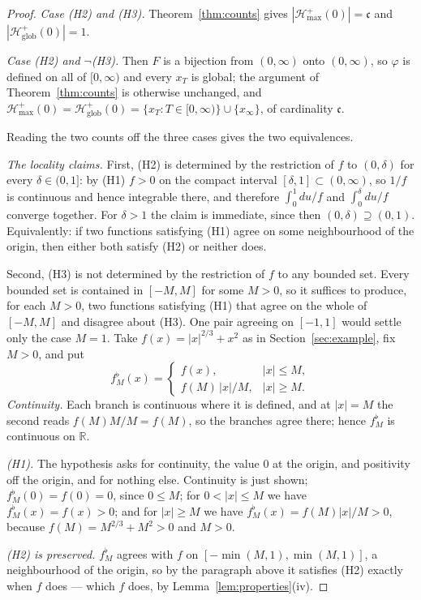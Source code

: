 \documentclass[12pt]{article}
\theoremstyle{plain}
\theoremstyle{definition}
\theoremstyle{remark}
\newcommand{\R}{\mathbb{R}}
\newcommand{\cont}{\mathfrak{c}}
\newcommand{\Hglob}{\mathcal{H}^{+}_{\mathrm{glob}}}
\newcommand{\Hmax}{\mathcal{H}^{+}_{\max}}
\begin{document}
\begin{proof}
\smallskip
\emph{Case \textup{(H2)} and \textup{(H3)}.} Theorem~\ref{thm:counts} gives
$|\Hmax(0)|=\cont$ and $|\Hglob(0)|=1$.

\smallskip
\emph{Case \textup{(H2)} and $\neg$\textup{(H3)}.} Then $F$ is a bijection from
$(0,\infty)$ onto $(0,\infty)$, so $\varphi$ is defined on all of $[0,\infty)$
and every $x_{T}$ is global; the argument of Theorem~\ref{thm:counts} is
otherwise unchanged, and $\Hmax(0)=\Hglob(0)=\{x_{T}:T\in[0,\infty)\}\cup
\{x_{\infty}\}$, of cardinality $\cont$.

\smallskip
Reading the two counts off the three cases gives the two equivalences.

\smallskip
\emph{The locality claims.} First, (H2) is determined by the restriction of $f$ to
$(0,\delta)$ for every $\delta\in(0,1]$: by (H1) $f>0$ on the compact interval
$[\delta,1]\subset(0,\infty)$, so $1/f$ is continuous and hence integrable
there, and therefore $\int_{0}^{1}du/f$ and $\int_{0}^{\delta}du/f$ converge
together. For $\delta>1$ the claim is immediate, since then
$(0,\delta)\supseteq(0,1)$. Equivalently: if two functions satisfying (H1) agree
on some neighbourhood of the origin, then either both satisfy (H2) or neither
does.

Second, (H3) is not determined by the restriction of $f$ to any bounded set. Every
bounded set is contained in $[-M,M]$ for some $M>0$, so it suffices to produce,
for each $M>0$, two functions satisfying (H1) that agree on the whole of
$[-M,M]$ and disagree about (H3). One pair agreeing on $[-1,1]$ would settle
only the case $M=1$. Take $f(x)=|x|^{2/3}+x^{2}$ as in
Section~\ref{sec:example}, fix $M>0$, and put
\[
  f^{\flat}_{M}(x)=\begin{cases}
    f(x), & |x|\le M,\\[2pt]
    f(M)\,|x|/M, & |x|\ge M .
  \end{cases}
\]
\emph{Continuity.} Each branch is continuous where it is defined, and at
$|x|=M$ the second reads $f(M)M/M=f(M)$, so the branches agree there; hence
$f^{\flat}_{M}$ is continuous on $\R$.

\emph{\textup{(H1)}.} The hypothesis asks for continuity, the value $0$ at the
origin, and positivity off the origin, and for nothing else. Continuity is just
shown; $f^{\flat}_{M}(0)=f(0)=0$, since $0\le M$; for $0<|x|\le M$ we have
$f^{\flat}_{M}(x)=f(x)>0$; and for $|x|\ge M$ we have
$f^{\flat}_{M}(x)=f(M)|x|/M>0$, because $f(M)=M^{2/3}+M^{2}>0$ and $M>0$.

\emph{\textup{(H2)} is preserved.} $f^{\flat}_{M}$ agrees with $f$ on
$[-\min(M,1),\min(M,1)]$, a neighbourhood of the origin, so by the paragraph
above it satisfies (H2) exactly when $f$ does --- which $f$ does, by
Lemma~\ref{lem:properties}(iv).


\end{proof}
\end{document}

